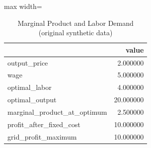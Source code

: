 \begin{table}[htbp]
\centering
\caption{Marginal Product and Labor Demand (original synthetic data)}
\begingroup
\small
\setlength{\tabcolsep}{6pt}
\renewcommand{\arraystretch}{1.12}
\begin{adjustbox}{max width=\linewidth}
\begin{tabular}{@{}lr@{}}
\toprule
 & value \\
\midrule
output\_price & 2.000000 \\
wage & 5.000000 \\
optimal\_labor & 4.000000 \\
optimal\_output & 20.000000 \\
marginal\_product\_at\_optimum & 2.500000 \\
profit\_after\_fixed\_cost & 10.000000 \\
grid\_profit\_maximum & 10.000000 \\
\bottomrule
\end{tabular}
\end{adjustbox}
\endgroup
\end{table}